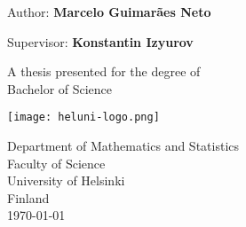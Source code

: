 \begin{titlepage}
    \begin{center}
            
        \Huge
        \textbf{\thtitle}
            
        \vspace{0.5cm}
        \LARGE
        \thsubtitle  

        \vspace{1.5cm}
            
        Author: \textbf{Marcelo Guimarães Neto}
        
		Supervisor: \textbf{Konstantin Izyurov}

        \vfill
            
        A thesis presented for the degree of\\
        Bachelor of Science
            
        \vspace{0.8cm}
            
        \texttt{[image: heluni-logo.png]}
        
        \vspace{0.8cm}
            
        \Large
        Department of Mathematics and Statistics\\
        Faculty of Science\\
        University of Helsinki\\
        Finland\\
        \today
            
    \end{center}
\end{titlepage}
